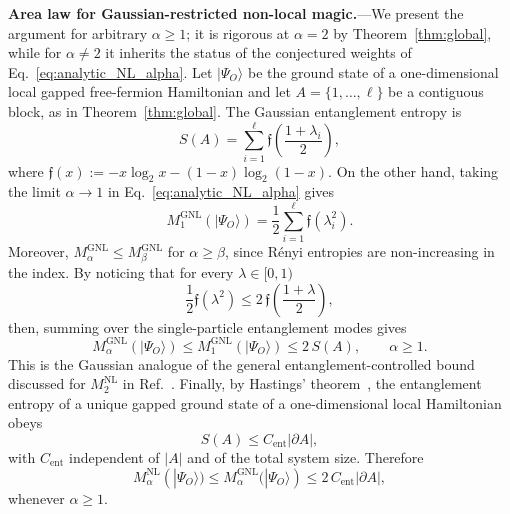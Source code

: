 \documentclass[aps,prl,twocolumn,superscriptaddress,reprint,longbibliography,nofootinbib]{revtex4-2}
\newcommand{\RENYI}{\alpha}
\begin{document}
\textbf{Area law for Gaussian-restricted non-local magic.}---We present the argument for arbitrary $\RENYI\ge1$; it is rigorous at $\RENYI=2$ by Theorem~\ref{thm:global}, while for $\RENYI\neq2$ it inherits the status of the conjectured weights of Eq.~\eqref{eq:analytic_NL_alpha}.
Let $|\Psi_O\rangle$ be the ground state of a one-dimensional local gapped free-fermion Hamiltonian and let $A=\{1,\dots,\ell\}$ be a contiguous block, as in Theorem~\ref{thm:global}. The Gaussian entanglement entropy is
\begin{equation}
    S(A)=
    \sum_{i=1}^{\ell}
    \mathfrak{f}\!\left(\frac{1+\lambda_i}{2}\right),
    \label{eq:gaussian_entropy_area_law_sec}
\end{equation}
where $\mathfrak{f}(x):=-x\log_2x-(1-x)\log_2(1-x)$. On the other hand, taking the limit \(\RENYI\to1\) in Eq.~\eqref{eq:analytic_NL_alpha} gives
\begin{equation}
    M_{1}^{\mathrm{GNL}}(|\Psi_O\rangle)
    =
    \frac{1}{2}
    \sum_{i=1}^{\ell}
    \mathfrak{f}(\lambda_i^2).
    \label{eq:M1_GNL}
\end{equation}
Moreover, $M_{\alpha}^{\mathrm{GNL}}\le M_{\beta}^{\mathrm{GNL}}$ for $\alpha\ge\beta$, since R\'enyi entropies are non-increasing in the index. By noticing that for every $\lambda\in[0,1)$
\begin{equation}
    \frac{1}{2}\mathfrak{f}(\lambda^2)
    \le
    2\, \mathfrak{f}\!\left(\frac{1+\lambda}{2}\right),
    \label{eq:m1_entropy_bound}
\end{equation}
then, summing over the single-particle entanglement modes gives
\begin{equation}
    M_{\RENYI}^{\mathrm{GNL}}(|\Psi_O\rangle)
    \le
    M_{1}^{\mathrm{GNL}}(|\Psi_O\rangle)
    \le
    2\, S(A),
    \qquad
    \RENYI\ge1.
    \label{eq:GNL_bound_by_entropy_all_alpha}
\end{equation}
This is the Gaussian analogue of the general entanglement-controlled bound discussed for $M_2^{\mathrm{NL}}$ in Ref.~\cite{Cao_2025}.
Finally, by Hastings' theorem~\cite{Hastings_2007}, the entanglement entropy of a unique gapped ground state of a one-dimensional local Hamiltonian obeys
\begin{equation}
    S(A)\le C_{\mathrm{ent}}|\partial A|,
    \label{eq:Hastings_area_law}
\end{equation}
with $C_{\mathrm{ent}}$ independent of $|A|$ and of the total system size. Therefore
\begin{equation}
    M_{\RENYI}^{\mathrm{NL}}(|\Psi_O\rangle)
    \le
    M_{\RENYI}^{\mathrm{GNL}}(|\Psi_O\rangle)
    \le
    2\, C_{\mathrm{ent}}|\partial A|,
    \label{eq:GNL_area_law_final}
\end{equation}
whenever $\RENYI\ge1$.
\end{document}
